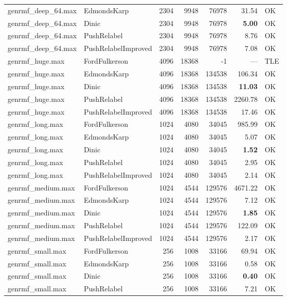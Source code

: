 \begin{longtable}{llrrrrl}
genrmf\_deep\_64.max & EdmondsKarp & 2304 & 9948 & 76978 & 31.54 & OK \\
genrmf\_deep\_64.max & Dinic & 2304 & 9948 & 76978 & \textbf{5.00} & OK \\
genrmf\_deep\_64.max & PushRelabel & 2304 & 9948 & 76978 & 8.76 & OK \\
genrmf\_deep\_64.max & PushRelabelImproved & 2304 & 9948 & 76978 & 7.08 & OK \\
\midrule
genrmf\_huge.max & FordFulkerson & 4096 & 18368 & -1 & --- & TLE \\
genrmf\_huge.max & EdmondsKarp & 4096 & 18368 & 134538 & 106.34 & OK \\
genrmf\_huge.max & Dinic & 4096 & 18368 & 134538 & \textbf{11.03} & OK \\
genrmf\_huge.max & PushRelabel & 4096 & 18368 & 134538 & 2260.78 & OK \\
genrmf\_huge.max & PushRelabelImproved & 4096 & 18368 & 134538 & 17.46 & OK \\
\midrule
genrmf\_long.max & FordFulkerson & 1024 & 4080 & 34045 & 985.99 & OK \\
genrmf\_long.max & EdmondsKarp & 1024 & 4080 & 34045 & 5.07 & OK \\
genrmf\_long.max & Dinic & 1024 & 4080 & 34045 & \textbf{1.52} & OK \\
genrmf\_long.max & PushRelabel & 1024 & 4080 & 34045 & 2.95 & OK \\
genrmf\_long.max & PushRelabelImproved & 1024 & 4080 & 34045 & 2.14 & OK \\
\midrule
genrmf\_medium.max & FordFulkerson & 1024 & 4544 & 129576 & 4671.22 & OK \\
genrmf\_medium.max & EdmondsKarp & 1024 & 4544 & 129576 & 7.12 & OK \\
genrmf\_medium.max & Dinic & 1024 & 4544 & 129576 & \textbf{1.85} & OK \\
genrmf\_medium.max & PushRelabel & 1024 & 4544 & 129576 & 122.09 & OK \\
genrmf\_medium.max & PushRelabelImproved & 1024 & 4544 & 129576 & 2.17 & OK \\
\midrule
genrmf\_small.max & FordFulkerson & 256 & 1008 & 33166 & 69.94 & OK \\
genrmf\_small.max & EdmondsKarp & 256 & 1008 & 33166 & 0.58 & OK \\
genrmf\_small.max & Dinic & 256 & 1008 & 33166 & \textbf{0.40} & OK \\
genrmf\_small.max & PushRelabel & 256 & 1008 & 33166 & 7.21 & OK \\

\end{longtable}
